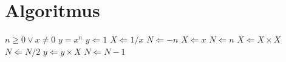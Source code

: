\chapter{Algoritmus\label{att:algorithms}}

\begin{algorithm}
\caption{Vypočítaj $y = x^n$}  
\label{alg:calculation-1}                         
\begin{algorithmic}                    
    \REQUIRE $n \geq 0 \vee x \neq 0$
    \ENSURE $y = x^n$
    \STATE $y \Leftarrow 1$
        \STATE $X \Leftarrow 1 / x$
        \STATE $N \Leftarrow -n$
    \ELSE
        \STATE $X \Leftarrow x$
        \STATE $N \Leftarrow n$
    \ENDIF
            \STATE $X \Leftarrow X \times X$
            \STATE $N \Leftarrow N / 2$
        \ELSE[$N$ is odd]
            \STATE $y \Leftarrow y \times X$
            \STATE $N \Leftarrow N - 1$
        \ENDIF
    \ENDWHILE
\end{algorithmic}
\end{algorithm}
